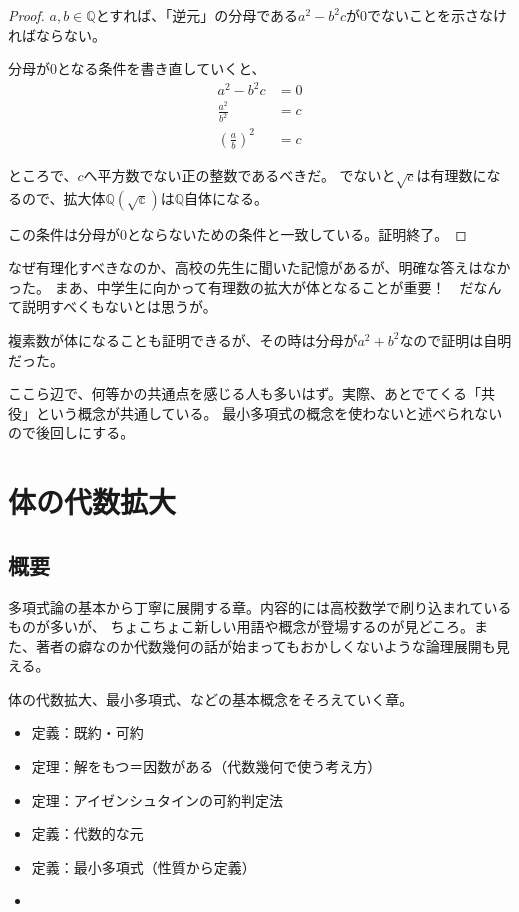 \documentclass[uplatex]{jsarticle}
\begin{document}
\begin{proof}
    $a, b \in \mathbb{Q}$とすれば、「逆元」の分母である$a^2 - b^2 c$が$0$でないことを示さなければならない。

    分母が$0$となる条件を書き直していくと、
    \begin{align}
        a^2 - b^2 c                  & = 0 \\
        \frac{a^2}{b^2}              & = c \\
        \left( \frac{a}{b} \right)^2 & = c
    \end{align}

    ところで、$c$へ平方数でない正の整数であるべきだ。
    でないと$\sqrt{c}$は有理数になるので、拡大体$\mathbb{Q(\sqrt{c})}$は$\mathbb{Q}$自体になる。

    この条件は分母が$0$とならないための条件と一致している。証明終了。
\end{proof}

なぜ有理化すべきなのか、高校の先生に聞いた記憶があるが、明確な答えはなかった。
まあ、中学生に向かって有理数の拡大が体となることが重要！　だなんて説明すべくもないとは思うが。

複素数が体になることも証明できるが、その時は分母が$a^2 + b^2$なので証明は自明だった。

ここら辺で、何等かの共通点を感じる人も多いはず。実際、あとでてくる「共役」という概念が共通している。
最小多項式の概念を使わないと述べられないので後回しにする。


\section{体の代数拡大}

\subsection{概要}
多項式論の基本から丁寧に展開する章。内容的には高校数学で刷り込まれているものが多いが、
ちょこちょこ新しい用語や概念が登場するのが見どころ。また、著者の癖なのか代数幾何の話が始まってもおかしくないような論理展開も見える。

体の代数拡大、最小多項式、などの基本概念をそろえていく章。

\begin{itemize}
    \item 定義：既約・可約
    \item 定理：解をもつ＝因数がある（代数幾何で使う考え方）
    \item 定理：アイゼンシュタインの可約判定法
    \item 定義：代数的な元
    \item 定義：最小多項式（性質から定義）
    \item
\end{itemize}
\end{document}
